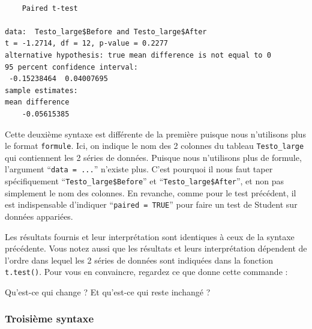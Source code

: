 \documentclass[
  a4paper,
  DIV=11,
  numbers=noendperiod,
  oneside]{scrreprt}
\newenvironment{Shaded}{}{}
\newcommand{\AttributeTok}[1]{\textcolor[rgb]{0.84,0.23,0.29}{#1}}
\newcommand{\CommentTok}[1]{\textcolor[rgb]{0.42,0.45,0.49}{#1}}
\newcommand{\ConstantTok}[1]{\textcolor[rgb]{0.00,0.36,0.77}{#1}}
\newcommand{\DecValTok}[1]{\textcolor[rgb]{0.00,0.36,0.77}{#1}}
\newcommand{\FunctionTok}[1]{\textcolor[rgb]{0.44,0.26,0.76}{#1}}
\newcommand{\NormalTok}[1]{\textcolor[rgb]{0.14,0.16,0.18}{#1}}
\newcommand{\SpecialCharTok}[1]{\textcolor[rgb]{0.00,0.36,0.77}{#1}}
\begin{document}
\begin{verbatim}

    Paired t-test

data:  Testo_large$Before and Testo_large$After
t = -1.2714, df = 12, p-value = 0.2277
alternative hypothesis: true mean difference is not equal to 0
95 percent confidence interval:
 -0.15238464  0.04007695
sample estimates:
mean difference 
    -0.05615385 
\end{verbatim}

Cette deuxième syntaxe est différente de la première puisque nous
n'utilisons plus le format \texttt{formule}. Ici, on indique le nom des
2 colonnes du tableau \texttt{Testo\_large} qui contiennent les 2 séries
de données. Puisque nous n'utilisons plus de formule, l'argument
``\texttt{data\ =\ ...}'' n'existe plus. C'est pourquoi il nous faut
taper spécifiquement ``\texttt{Testo\_large\$Before}'' et
``\texttt{Testo\_large\$After}'', et non pas simplement le nom des
colonnes. En revanche, comme pour le test précédent, il est
indispensable d'indiquer ``\texttt{paired\ =\ TRUE}'' pour faire un test
de Student sur données appariées.

Les résultats fournis et leur interprétation sont identiques à ceux de
la syntaxe précédente. Vous notez aussi que les résultats et leurs
interprétation dépendent de l'ordre dans lequel les 2 séries de données
sont indiquées dans la fonction \texttt{t.test()}. Pour vous en
convaincre, regardez ce que donne cette commande :

\begin{Shaded}
\end{Shaded}

Qu'est-ce qui change ? Et qu'est-ce qui reste inchangé ?

\hypertarget{troisiuxe8me-syntaxe}{%
\subsubsection{Troisième syntaxe}\label{troisiuxe8me-syntaxe}}

\begin{Shaded}
\end{Shaded}
\end{document}
